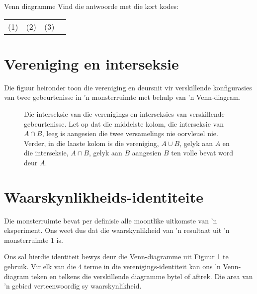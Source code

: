 \begin{exercises}{Venn diagramme}
  Vind die antwoorde met die kort kodes: \\
  \begin{tabularx}{\textwidth}{XXXX}
    (1) & (2) & (3) \\
  \end{tabularx}
\end{exercises}

\section{Vereniging en interseksie}


Die figuur heironder toon die vereniging en deursnit vir verskillende konfigurasies van twee gebeurtenisse in 'n monsterruimte met behulp van 'n Venn-diagram.

\begin{figure}[h]
  
  \caption{Die interseksie van die verenigings en interseksies van verskillende gebeurtenisse. Let op dat die middelste kolom, die interseksie van $A \cap B$, leeg is aangesien die twee versamelings nie oorvleuel nie. Verder, in die laaste kolom is die vereniging, $A \cup B$, gelyk aan $A$ en die interseksie, $A \cap B$, gelyk aan $B$ aangesien $B$ ten volle bevat word deur $A$.}
  \label{fig:venn_union_intersection}
\end{figure}


\section{Waarskynlikheids-identiteite}

Die monsterruimte bevat per definisie alle moontlike uitkomste van 'n eksperiment. Ons weet dus dat die waarskynlikheid van 'n resultaat uit 'n monsterruimte $1$ is.


Ons sal hierdie identiteit bewys deur die Venn-diagramme uit Figuur \ref{fig:venn_union_intersection} te gebruik. Vir elk van die $4$ terme in die verenigings-identiteit kan ons 'n Venn-diagram teken en telkens die verskillende diagramme bytel of aftrek. Die area van 'n gebied verteenwoordig sy waarskynlikheid.

